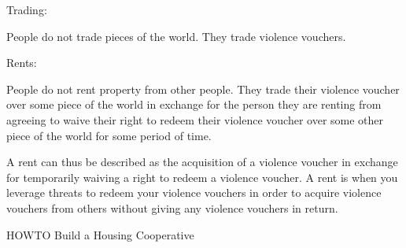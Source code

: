 \documentclass{article}
\begin{document}
\large Trading:

People do not trade pieces of the world. They trade violence vouchers. 

\large Rents:

People do not rent property from other people. They trade their violence voucher over some piece of the world in exchange for the person they are renting from agreeing to waive their right to redeem their violence voucher over some other piece of the world for some period of time.

A rent can thus be described as the acquisition of a violence voucher in exchange for temporarily waiving a right to redeem a violence voucher. A rent is when you leverage threats to redeem your violence vouchers in order to acquire violence vouchers from others without giving any violence vouchers in return.


\pagebreak
\huge HOWTO Build a Housing Cooperative

\vspace{1cm}
\end{document}

